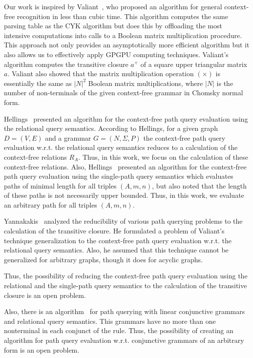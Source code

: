 Our work is inspired by Valiant~\cite{valiant}, who proposed an algorithm for general context-free recognition in less than cubic time. This algorithm computes the same parsing table as the CYK algorithm but does this by offloading the most intensive computations into calls to a Boolean matrix multiplication procedure. This approach not only provides an asymptotically more efficient algorithm but it also allows us to effectively apply GPGPU computing techniques. Valiant's algorithm computes the transitive closure $a^+$ of a square upper triangular matrix $a$. Valiant also showed that the matrix multiplication operation $(\times)$ is essentially the same as $|N|^2$ Boolean matrix multiplications, where $|N|$ is the number of non-terminals of the given context-free grammar in Chomsky normal form.

Hellings~\cite{hellingsRelational} presented an algorithm for the context-free path query evaluation using the relational query semantics. According to Hellings, for a given graph $D = (V, E)$ and a grammar $G = (N, \Sigma, P)$ the context-free path query evaluation w.r.t. the relational query semantics reduces to a calculation of the context-free relations $R_A$. Thus, in this work, we focus on the calculation of these context-free relations. Also, Hellings~\cite{hellingsRelational} presented an algorithm for the context-free path query evaluation using the single-path query semantics which evaluates paths of minimal length for all triples $(A,m,n)$, but also noted that the length of these paths is not necessarily upper bounded. Thus, in this work, we evaluate an arbitrary path for all triples $(A,m,n)$.

Yannakakis~\cite{transitive-closure} analyzed the reducibility of various path querying problems to the calculation of the transitive closure. He formulated a problem of Valiant's technique generalization to the context-free path query evaluation w.r.t. the relational query semantics. Also, he assumed that this technique cannot be generalized for arbitrary graphs, though it does for acyclic graphs.

Thus, the possibility of reducing the context-free path query evaluation using the relational and the single-path query semantics to the calculation of the transitive closure is an open problem.

Also, there is an algorithm~\cite{zhang2017context} for path querying with linear conjunctive grammars and relational query semantics. This grammars have no more than one nonterminal in each conjunct of the rule. Thus, the possibility of creating an algorithm for path query evaluation w.r.t. conjunctive grammars of an arbitrary form is an open problem.
